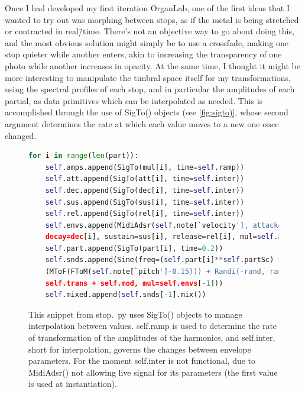 \documentclass[12pt,twoside,maitrise]{dms_ks}
\theoremstyle{definition}
\begin{document}
{{Once I had developed my first iteration OrganLab, one of the first ideas that I wanted to try out was morphing between stops, as if the metal is being stretched or contracted in real\=/time.
There's not an objective way to go about doing this, and the most obvious solution might simply be to use a crossfade, making one stop quieter while another enters, akin to increasing the transparency of one photo while another increases in opacity.
At the same time, I thought it might be more interesting to manipulate the timbral space itself for my transformations, using the spectral profiles of each stop, and in particular the amplitudes of each partial, as data primitives which can be interpolated as needed.
This is accomplished through the use of SigTo() objects (see \cref{fig:sigto)}, whose second argument determines the rate at which each value moves to a new one once changed.

\begin{figure}[H]
\begin{lstlisting}[language=Python]
for i in range(len(part)):
    self.amps.append(SigTo(mul[i], time=self.ramp))
    self.att.append(SigTo(att[i], time=self.inter))
    self.dec.append(SigTo(dec[i], time=self.inter))
    self.sus.append(SigTo(sus[i], time=self.inter))
    self.rel.append(SigTo(rel[i], time=self.inter))
    self.envs.append(MidiAdsr(self.note[`velocity'], attack=att[i],
    decay=dec[i], sustain=sus[i], release=rel[i], mul=self.amps[-1]))
    self.part.append(SigTo(part[i], time=0.2))
    self.snds.append(Sine(freq=(self.part[i]**self.partSc) * 
    (MToF(FToM(self.note[`pitch']-0.15))) + Randi(-rand, rand, 5) + 
    self.trans + self.mod, mul=self.envs[-1]))
    self.mixed.append(self.snds[-1].mix())
\end{lstlisting}
\caption{This snippet from stop.~py uses SigTo() objects to manage interpolation between values. self.ramp is used to determine the rate of transformation of the amplitudes of the harmonics, and self.inter, short for interpolation, governs the changes between envelope parameters. For the moment self.inter is not functional, due to MidiAdsr() not allowing live signal for its parameters (the first value is used at instantiation).} 
\label{fig:sigto}
\end{figure}

}}
\end{document}
